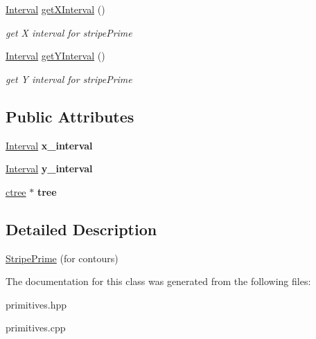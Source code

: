\begin{DoxyCompactItemize}
\hyperlink{classInterval}{Interval} \hyperlink{classStripePrime_af4886dd218f6d112979af84d1b3e12f6}{get\+X\+Interval} ()
\begin{DoxyCompactList}\small\item\em get X interval for stripe\+Prime \end{DoxyCompactList}\item 
\mbox{\label{classStripePrime_a4a7a44141952bacd0e9aff750381368e}} 
\hyperlink{classInterval}{Interval} \hyperlink{classStripePrime_a4a7a44141952bacd0e9aff750381368e}{get\+Y\+Interval} ()
\begin{DoxyCompactList}\small\item\em get Y interval for stripe\+Prime \end{DoxyCompactList}\end{DoxyCompactItemize}
\subsection*{Public Attributes}
\begin{DoxyCompactItemize}
\item 
\mbox{\label{classStripePrime_ac89ff54e25f8870769ac69719847762d}} 
\hyperlink{classInterval}{Interval} {\bfseries x\+\_\+interval}
\item 
\mbox{\label{classStripePrime_a8e6dbaddc02aa0e078800331645224d2}} 
\hyperlink{classInterval}{Interval} {\bfseries y\+\_\+interval}
\item 
\mbox{\label{classStripePrime_a6250dd3296a92550f5a4be5a9b892f8e}} 
\hyperlink{classctree}{ctree} $\ast$ {\bfseries tree}
\end{DoxyCompactItemize}


\subsection{Detailed Description}
\hyperlink{classStripePrime}{Stripe\+Prime} (for contours) 

The documentation for this class was generated from the following files\+:\begin{DoxyCompactItemize}
\item 
primitives.\+hpp\item 
primitives.\+cpp\end{DoxyCompactItemize}
